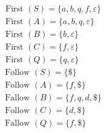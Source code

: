 $$
\begin{aligned}
& \text { First }(S)=\{a, b, q, f, \varepsilon \} \\
& \text { First }(A)=\{a, b, q, \varepsilon\} \\
& \text { First }(B)=\{b, \varepsilon\} \\
& \text { First }(C)=\{f, \varepsilon\} \\
& \text { First }(Q)=\{q, \varepsilon\}
\end{aligned}
$$
$$
\begin{aligned}
& \text { Follow }(S)=\{\$\} \\
& \text { Follow }(A)=\{f, \$\} \\
& \text { Fallow }(B)=\{f, q, d, \$\} \\
& \text { Follow }(C)=\{d, \$\} \\
& \text { Fallow }(Q)=\{f, \$\}
\end{aligned}
$$